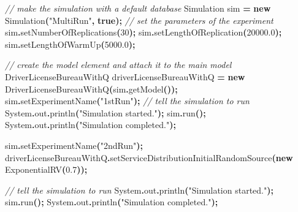 \documentclass[
]{book}
\newenvironment{Shaded}{\begin{snugshade}}{\end{snugshade}}
\newcommand{\BuiltInTok}[1]{#1}
\newcommand{\CommentTok}[1]{\textcolor[rgb]{0.56,0.35,0.01}{\textit{#1}}}
\newcommand{\DecValTok}[1]{\textcolor[rgb]{0.00,0.00,0.81}{#1}}
\newcommand{\FloatTok}[1]{\textcolor[rgb]{0.00,0.00,0.81}{#1}}
\newcommand{\FunctionTok}[1]{\textcolor[rgb]{0.00,0.00,0.00}{#1}}
\newcommand{\KeywordTok}[1]{\textcolor[rgb]{0.13,0.29,0.53}{\textbf{#1}}}
\newcommand{\NormalTok}[1]{#1}
\newcommand{\OperatorTok}[1]{\textcolor[rgb]{0.81,0.36,0.00}{\textbf{#1}}}
\newcommand{\StringTok}[1]{\textcolor[rgb]{0.31,0.60,0.02}{#1}}
\theoremstyle{definition}
\theoremstyle{definition}
\theoremstyle{definition}
\theoremstyle{definition}
\theoremstyle{remark}
\begin{document}
\begin{Shaded}
\begin{Highlighting}[]
\CommentTok{// make the simulation with a default database}
\NormalTok{Simulation sim }\OperatorTok{=} \KeywordTok{new} \FunctionTok{Simulation}\OperatorTok{(}\StringTok{"MultiRun"}\OperatorTok{,} \KeywordTok{true}\OperatorTok{);}
\CommentTok{// set the parameters of the experiment}
\NormalTok{sim}\OperatorTok{.}\FunctionTok{setNumberOfReplications}\OperatorTok{(}\DecValTok{30}\OperatorTok{);}
\NormalTok{sim}\OperatorTok{.}\FunctionTok{setLengthOfReplication}\OperatorTok{(}\FloatTok{20000.0}\OperatorTok{);}
\NormalTok{sim}\OperatorTok{.}\FunctionTok{setLengthOfWarmUp}\OperatorTok{(}\FloatTok{5000.0}\OperatorTok{);}

\CommentTok{// create the model element and attach it to the main model}
\NormalTok{DriverLicenseBureauWithQ driverLicenseBureauWithQ }\OperatorTok{=} \KeywordTok{new} \FunctionTok{DriverLicenseBureauWithQ}\OperatorTok{(}\NormalTok{sim}\OperatorTok{.}\FunctionTok{getModel}\OperatorTok{());}
\NormalTok{sim}\OperatorTok{.}\FunctionTok{setExperimentName}\OperatorTok{(}\StringTok{"1stRun"}\OperatorTok{);}
\CommentTok{// tell the simulation to run}
\BuiltInTok{System}\OperatorTok{.}\FunctionTok{out}\OperatorTok{.}\FunctionTok{println}\OperatorTok{(}\StringTok{"Simulation started."}\OperatorTok{);}
\NormalTok{sim}\OperatorTok{.}\FunctionTok{run}\OperatorTok{();}
\BuiltInTok{System}\OperatorTok{.}\FunctionTok{out}\OperatorTok{.}\FunctionTok{println}\OperatorTok{(}\StringTok{"Simulation completed."}\OperatorTok{);}

\NormalTok{sim}\OperatorTok{.}\FunctionTok{setExperimentName}\OperatorTok{(}\StringTok{"2ndRun"}\OperatorTok{);}
\NormalTok{driverLicenseBureauWithQ}\OperatorTok{.}\FunctionTok{setServiceDistributionInitialRandomSource}\OperatorTok{(}\KeywordTok{new} \FunctionTok{ExponentialRV}\OperatorTok{(}\FloatTok{0.7}\OperatorTok{));}

\CommentTok{// tell the simulation to run}
\BuiltInTok{System}\OperatorTok{.}\FunctionTok{out}\OperatorTok{.}\FunctionTok{println}\OperatorTok{(}\StringTok{"Simulation started."}\OperatorTok{);}
\NormalTok{sim}\OperatorTok{.}\FunctionTok{run}\OperatorTok{();}
\BuiltInTok{System}\OperatorTok{.}\FunctionTok{out}\OperatorTok{.}\FunctionTok{println}\OperatorTok{(}\StringTok{"Simulation completed."}\OperatorTok{);}


\end{Highlighting}
\end{Shaded}
\end{document}
